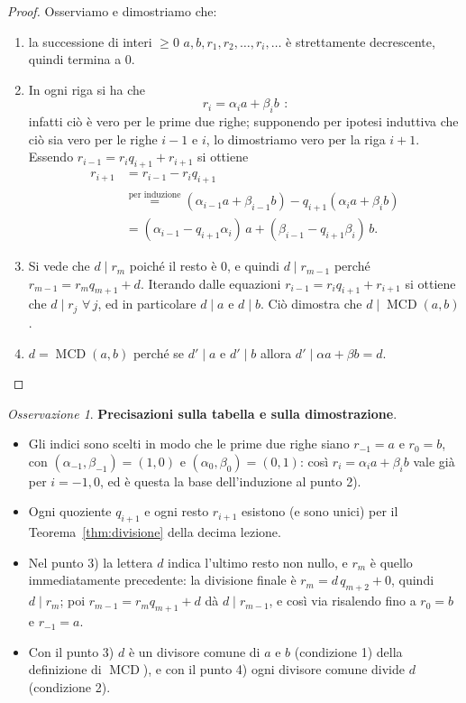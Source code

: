 \documentclass[11pt,a4paper]{article}
\theoremstyle{definition}
\theoremstyle{plain}
\theoremstyle{remark}
\newtheorem*{osservazione}{Osservazione}
\begin{document}
\begin{proof}
Osserviamo e dimostriamo che:
\begin{enumerate}[label=\arabic*),itemsep=3pt]
\item la successione di interi $\ge0$ $a,b,r_1,r_2,\dots,r_i,\dots$ è strettamente decrescente, quindi termina a $0$.
\item In ogni riga si ha che
\[
{\,r_i=\alpha_i a+\beta_i b\,}\ :
\]
infatti ciò è vero per le prime due righe; supponendo per ipotesi induttiva che ciò sia vero per le righe $i-1$ e $i$, lo dimostriamo vero per la riga $i+1$. Essendo $r_{i-1}=r_iq_{i+1}+r_{i+1}$ si ottiene
\begin{align*}
r_{i+1}&=r_{i-1}-r_iq_{i+1}\\
&\overset{\text{per induzione}}{=}(\alpha_{i-1}a+\beta_{i-1}b)-q_{i+1}(\alpha_ia+\beta_ib)\\
&=(\alpha_{i-1}-q_{i+1}\alpha_i)\,a+(\beta_{i-1}-q_{i+1}\beta_i)\,b .
\end{align*}
\item Si vede che $d\mid r_m$ poiché il resto è $0$, e quindi $d\mid r_{m-1}$ perché $r_{m-1}=r_mq_{m+1}+d$. Iterando dalle equazioni $r_{i-1}=r_iq_{i+1}+r_{i+1}$ si ottiene che $d\mid r_j$ $\forall\,j$, ed in particolare $d\mid a$ e $d\mid b$. Ciò dimostra che $d\mid\operatorname{MCD}(a,b)$.
\item $d=\operatorname{MCD}(a,b)$ perché se $d'\mid a$ e $d'\mid b$ allora $d'\mid\alpha a+\beta b=d$. \qedhere
\end{enumerate}
\end{proof}

\begin{osservazione}
\textbf{Precisazioni sulla tabella e sulla dimostrazione}. 
\begin{itemize}[nosep]
\item Gli indici sono scelti in modo che le prime due righe siano $r_{-1}=a$ e $r_0=b$, con $(\alpha_{-1},\beta_{-1})=(1,0)$ e $(\alpha_0,\beta_0)=(0,1)$: così $r_i=\alpha_ia+\beta_ib$ vale già per $i=-1,0$, ed è questa la base dell'induzione al punto 2).
\item Ogni quoziente $q_{i+1}$ e ogni resto $r_{i+1}$ esistono (e sono unici) per il Teorema~\ref{thm:divisione} della decima lezione.
\item Nel punto 3) la lettera $d$ indica l'ultimo resto non nullo, e $r_m$ è quello immediatamente precedente: la divisione finale è $r_m=d\,q_{m+2}+0$, quindi $d\mid r_m$; poi $r_{m-1}=r_mq_{m+1}+d$ dà $d\mid r_{m-1}$, e così via risalendo fino a $r_0=b$ e $r_{-1}=a$.
\item Con il punto 3) $d$ è un divisore comune di $a$ e $b$ (condizione 1) della definizione di $\operatorname{MCD}$), e con il punto 4) ogni divisore comune divide $d$ (condizione 2).
\end{itemize}
\end{osservazione}
\end{document}
